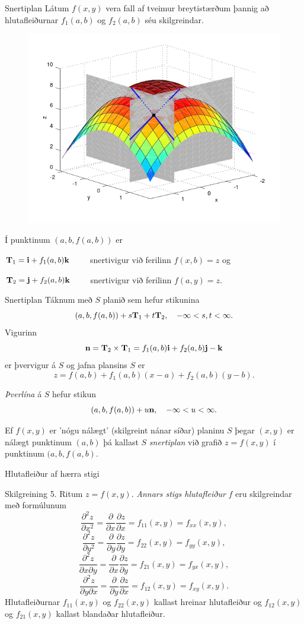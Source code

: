 \begin {frame}{Snertiplan}
  Látum $f(x,y)$ vera fall af tveimur breytistærðum þannig að hlutafleiðurnar $f_1(a,b)$ og $f_2(a,b)$ séu skilgreindar.
  \begin{figure}
           \centering
            \includegraphics[width=0.6\linewidth]{bothpart.png}
    \end{figure}
    Í punktinum $(a,b,f(a,b))$ er 
    
    $\mbox{${\bf T}$}_1 = \mbox{${\bf i}$} + f_1(a,b)\mbox{${\bf k}$}\qquad$ snertivigur við ferilinn $f(x,b) = z$ og
    
    $\mbox{${\bf T}$}_2 = \mbox{${\bf j}$} + f_2(a,b)\mbox{${\bf k}$}\qquad$ snertivigur við ferilinn $f(a,y) = z$.
\end {frame}



\begin {frame}{Snertiplan}
 Táknum með $S$ planið sem hefur stikunina
$$(a,b,f(a,b))+s\mbox{${\bf T}$}_1+t\mbox{${\bf T}$}_2, \quad -\infty < s,t < \infty.$$
Vigurinn 
$$\mbox{${\bf n}$}=\mbox{${\bf T}$}_2\times \mbox{${\bf T}$}_1=f_1(a,b)\mbox{${\bf i}$}+f_2(a,b)\mbox{${\bf j}$}-\mbox{${\bf k}$}$$
er þvervigur á $S$ og jafna plansins $S$ er
$$z=f(a,b)+f_1(a,b)(x-a)+f_2(a,b)(y-b).$$

\emph{Þverlína} á $S$ hefur stikun
$$(a,b,f(a,b)) + u \mbox{${\bf n}$}, \quad -\infty < u < \infty.$$

Ef $f(x,y)$ er 'nógu nálægt' (skilgreint nánar síðar) planinu $S$ þegar $(x,y)$ er nálægt punktinum $(a,b)$ þá kallast $S$ \emph{snertiplan} við grafið $z=f(x,y)$ í punktinum $(a,b,f(a,b)$.
\end {frame}

\begin {frame}{Hlutafleiður af hærra stigi}
 \begin {block}{Skilgreining 5.}
  Ritum $z=f(x,y)$.  {\em Annars stigs
  hlutafleiður} $f$ eru skilgreindar með formúlunum
$$\frac{\partial^2 z}{\partial x^2}=
\frac{\partial}{\partial x} \frac{\partial z}{\partial x}
=f_{11}(x,y)=f_{xx}(x,y),$$
$$\frac{\partial^2 z}{\partial y^2}=
\frac{\partial}{\partial y} \frac{\partial z}{\partial y}
=f_{22}(x,y)=f_{yy}(x,y),$$
$$\frac{\partial^2 z}{\partial x\partial y}=
\frac{\partial}{\partial x} \frac{\partial z}{\partial y}
=f_{21}(x,y)=f_{yx}(x,y),$$
$$\frac{\partial^2 z}{\partial y\partial x}=
\frac{\partial}{\partial y} \frac{\partial z}{\partial x}
=f_{12}(x,y)=f_{xy}(x,y).$$
Hlutafleiðurnar $f_{11}(x,y)$ og $f_{22}(x,y)$ kallast hreinar
hlutafleiður og $f_{12}(x,y)$ og $f_{21}(x,y)$ kallast blandaðar
hlutafleiður.  
 \end {block}

\end {frame}

